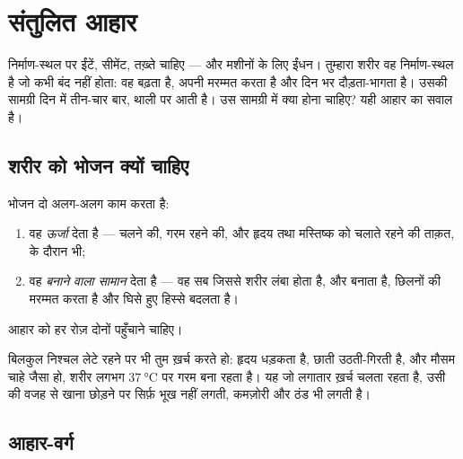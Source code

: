 \chapter{संतुलित आहार}\label{ch:g3:balanced-diet}

निर्माण-स्थल पर ईंटें, सीमेंट, तख़्ते चाहिए --- और मशीनों के लिए ईंधन।
तुम्हारा शरीर वह निर्माण-स्थल है जो कभी बंद नहीं होता: वह बढ़ता है,
अपनी मरम्मत करता है और दिन भर दौड़ता-भागता है। उसकी सामग्री दिन में
तीन-चार बार, थाली पर आती है। उस सामग्री में क्या होना चाहिए? यही आहार
का सवाल है।

\section{शरीर को भोजन क्यों चाहिए}

\begin{proposition}[भोजन के दो काम]\label{prop:g3:balanced-diet:jobs}
भोजन दो अलग-अलग काम करता है:
\begin{enumerate}
  \item वह \emph{ऊर्जा} देता है --- चलने की,
        गरम रहने की, और हृदय तथा मस्तिष्क को चलाते रहने की ताक़त,
         के दौरान भी;
  \item वह \emph{बनाने वाला सामान} देता है --- वह सब जिससे शरीर लंबा
        होता है,  और  बनाता है, छिलनों की मरम्मत करता है और
        घिसे हुए हिस्से बदलता है।
\end{enumerate}
आहार को हर रोज़ दोनों पहुँचाने चाहिए।
\end{proposition}
\admitted

\begin{example}[आराम में भी ईंधन]\label{ex:g3:balanced-diet:rest}
बिलकुल निश्चल लेटे रहने पर भी तुम  ख़र्च करते हो: हृदय धड़कता है,
छाती उठती-गिरती है, और मौसम चाहे जैसा हो, शरीर लगभग
$\qty{37}{\degreeCelsius}$ पर गरम बना रहता है। यह जो लगातार ख़र्च चलता
रहता है, उसी की वजह से खाना छोड़ने पर सिर्फ़ भूख नहीं लगती, कमज़ोरी और
ठंड भी लगती है।
\end{example}

\section{आहार-वर्ग}

